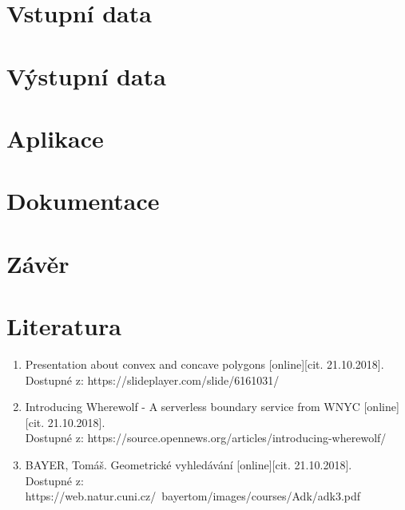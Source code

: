 \documentclass[a4paper, 12pt]{article}
\begin{document}
\section{Vstupní data}


\section{Výstupní data}

\section{Aplikace}

\section{Dokumentace}

\clearpage
\section{Závěr}

\clearpage
\section{Literatura}
\begin{enumerate}
\item  Presentation about convex and concave polygons [online][cit. 21.10.2018]. \\
Dostupné z: https://slideplayer.com/slide/6161031/  \\
\item  Introducing Wherewolf - A serverless boundary service from WNYC [online][cit. 21.10.2018]. \\
Dostupné z: https://source.opennews.org/articles/introducing-wherewolf/  \\
\item  BAYER, Tomáš. Geometrické vyhledávání [online][cit. 21.10.2018]. \\
Dostupné z: https://web.natur.cuni.cz/~bayertom/images/courses/Adk/adk3.pdf  \\

\end{enumerate}
\end{document}
